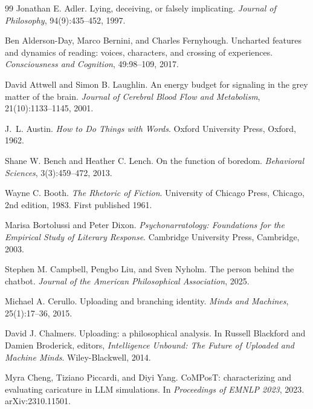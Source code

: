 \documentclass[11pt,a4paper]{article}
\theoremstyle{remark}\newtheorem{remark}[definition]{Remark}
\begin{document}
\begin{thebibliography}{99}
Jonathan E. Adler.
\newblock Lying, deceiving, or falsely implicating.
\newblock \emph{Journal of Philosophy}, 94(9):435--452, 1997.

Ben Alderson-Day, Marco Bernini, and Charles Fernyhough.
\newblock Uncharted features and dynamics of reading: voices, characters, and crossing of experiences.
\newblock \emph{Consciousness and Cognition}, 49:98--109, 2017.

David Attwell and Simon B. Laughlin.
\newblock An energy budget for signaling in the grey matter of the brain.
\newblock \emph{Journal of Cerebral Blood Flow and Metabolism}, 21(10):1133--1145, 2001.

J.~L. Austin.
\newblock \emph{How to Do Things with Words}.
\newblock Oxford University Press, Oxford, 1962.

Shane W. Bench and Heather C. Lench.
\newblock On the function of boredom.
\newblock \emph{Behavioral Sciences}, 3(3):459--472, 2013.

Wayne C. Booth.
\newblock \emph{The Rhetoric of Fiction}.
\newblock University of Chicago Press, Chicago, 2nd edition, 1983. First published 1961.

Marisa Bortolussi and Peter Dixon.
\newblock \emph{Psychonarratology: Foundations for the Empirical Study of Literary Response}.
\newblock Cambridge University Press, Cambridge, 2003.

Stephen M. Campbell, Pengbo Liu, and Sven Nyholm.
\newblock The person behind the chatbot.
\newblock \emph{Journal of the American Philosophical Association}, 2025.

Michael A. Cerullo.
\newblock Uploading and branching identity.
\newblock \emph{Minds and Machines}, 25(1):17--36, 2015.

David J. Chalmers.
\newblock Uploading: a philosophical analysis.
\newblock In Russell Blackford and Damien Broderick, editors, \emph{Intelligence Unbound: The Future of Uploaded and Machine Minds}. Wiley-Blackwell, 2014.

Myra Cheng, Tiziano Piccardi, and Diyi Yang.
\newblock CoMPosT: characterizing and evaluating caricature in LLM simulations.
\newblock In \emph{Proceedings of EMNLP 2023}, 2023. arXiv:2310.11501.


\end{thebibliography}
\end{document}
